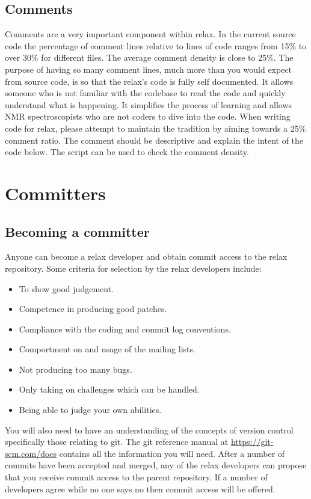 \subsection{Comments}

Comments are a very important component within relax.
In the current source code the percentage of comment lines relative to lines of code ranges from 15\% to over 30\% for different files.
The average comment density is close to 25\%.
The purpose of having so many comment lines, much more than you would expect from source code, is so that the relax's code is fully self documented.
It allows someone who is not familiar with the codebase to read the code and quickly understand what is happening.
It simplifies the process of learning and allows NMR spectroscopists who are not coders to dive into the code.
When writing code for relax, please attempt to maintain the tradition by aiming towards a 25\% comment ratio.
The comment should be descriptive and explain the intent of the code below.
The script  can be used to check the comment density.




\section{Committers}


\subsection{Becoming a committer}\label{becoming a committer}

Anyone can become a relax developer and obtain commit access to the relax repository.
Some criteria for selection by the relax developers include:
\begin{itemize}
    \item To show good judgement.
    \item Competence in producing good patches.
    \item Compliance with the coding and commit log conventions.
    \item Comportment on and usage of the mailing lists.
    \item Not producing too many bugs.
    \item Only taking on challenges which can be handled.
    \item Being able to judge your own abilities.
\end{itemize}
You will also need to have an understanding of the concepts of version control specifically those relating to git.
The git reference manual at \url{https://git-scm.com/docs} contains all the information you will need.
After a number of commits have been accepted and merged, any of the relax developers can propose that you receive commit access to the parent repository.
If a number of developers agree while no one says no then commit access will be offered.

